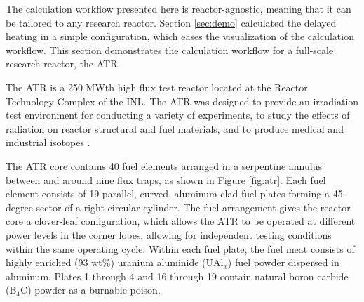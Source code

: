 

The calculation workflow presented here is reactor-agnostic, meaning that it can be tailored to any research reactor.
Section \ref{sec:demo} calculated the delayed heating in a simple configuration, which eases the visualization of the calculation workflow.
This section demonstrates the calculation workflow for a full-scale research reactor, the \gls*{ATR}.

The \gls*{ATR} is a 250 MWth high flux test reactor located at the Reactor Technology Complex of the \gls*{INL}.
The ATR was designed to provide an irradiation test environment for conducting a variety of experiments, to study the effects of radiation on reactor structural and fuel materials, and to produce medical and industrial isotopes \cite{ICSBEP, tomberlin_advanced_2002}.

The ATR core contains 40 fuel elements arranged in a serpentine annulus between and around nine flux traps, as shown in Figure \ref{fig:atr}.
Each fuel element consists of 19 parallel, curved, aluminum-clad fuel plates forming a 45-degree sector of a right circular cylinder.
The fuel arrangement gives the reactor core a clover-leaf configuration, which allows the \gls*{ATR} to be operated at different power levels in the corner lobes, allowing for independent testing conditions within the same operating cycle.
Within each fuel plate, the fuel meat consists of highly enriched (93 wt\%) uranium aluminide (UAl$_x$) fuel powder dispersed in aluminum.
Plates 1 through 4 and 16 through 19 contain natural boron carbide (B$_4$C) powder as a burnable poison.

